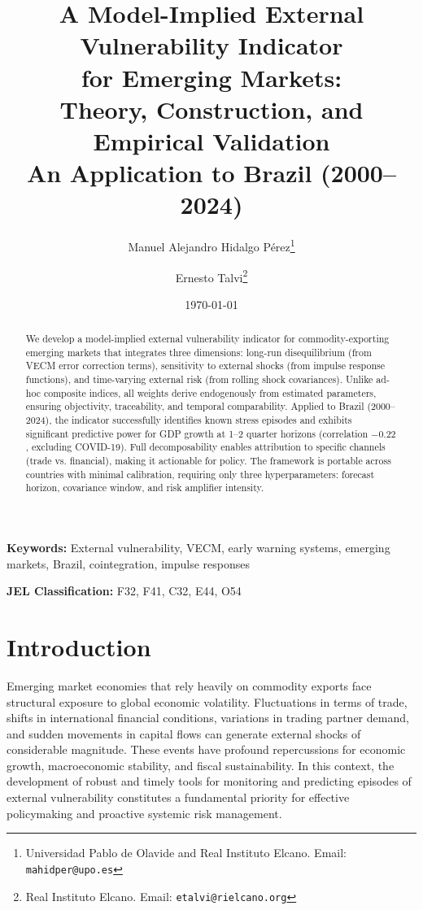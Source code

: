 \documentclass[12pt,a4paper]{article}
\title{
  \Large{\textbf{A Model-Implied External Vulnerability Indicator\\
  for Emerging Markets:\\
  Theory, Construction, and Empirical Validation}}\\[1em]
  \normalsize{An Application to Brazil (2000--2024)}
}
\author{
  Manuel Alejandro Hidalgo Pérez\thanks{Universidad Pablo de Olavide and Real Instituto Elcano. Email: \texttt{mahidper@upo.es}} 
  \and 
  Ernesto Talvi\thanks{Real Instituto Elcano. Email: \texttt{etalvi@rielcano.org}}
}
\date{\today}
\numberwithin{equation}{section}
\theoremstyle{definition}
\theoremstyle{remark}
\begin{document}
\maketitle
\thispagestyle{empty}

\begin{abstract}
\noindent
We develop a model-implied external vulnerability indicator for commodity-exporting emerging markets that integrates three dimensions: long-run disequilibrium (from VECM error correction terms), sensitivity to external shocks (from impulse response functions), and time-varying external risk (from rolling shock covariances). Unlike ad-hoc composite indices, all weights derive endogenously from estimated parameters, ensuring objectivity, traceability, and temporal comparability. Applied to Brazil (2000--2024), the indicator successfully identifies known stress episodes and exhibits significant predictive power for GDP growth at 1--2 quarter horizons (correlation $-0.22$, excluding COVID-19). Full decomposability enables attribution to specific channels (trade vs. financial), making it actionable for policy. The framework is portable across countries with minimal calibration, requiring only three hyperparameters: forecast horizon, covariance window, and risk amplifier intensity.
\end{abstract}

\vspace{0.5cm}

\noindent\textbf{Keywords:} External vulnerability, VECM, early warning systems, emerging markets, Brazil, cointegration, impulse responses

\noindent\textbf{JEL Classification:} F32, F41, C32, E44, O54

\clearpage
\tableofcontents
\clearpage



\section{Introduction}


Emerging market economies that rely heavily on commodity exports face structural exposure to global economic volatility. Fluctuations in terms of trade, shifts in international financial conditions, variations in trading partner demand, and sudden movements in capital flows can generate external shocks of considerable magnitude. These events have profound repercussions for economic growth, macroeconomic stability, and fiscal sustainability. In this context, the development of robust and timely tools for monitoring and predicting episodes of external vulnerability constitutes a fundamental priority for effective policymaking and proactive systemic risk management.
\end{document}
